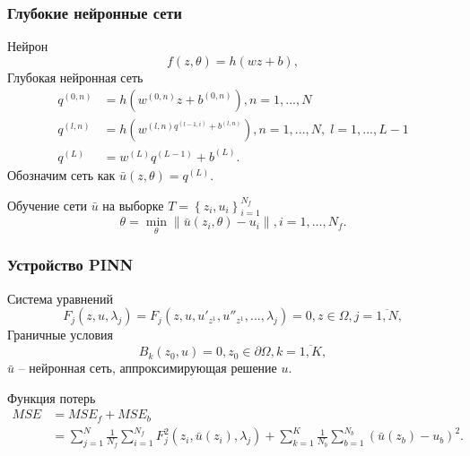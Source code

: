 \documentclass[t]{beamer}
\newcommand{\brr}[1]{{\left( #1 \right)}}
\newcommand{\brc}[1]{{\left\{ #1 \right\}}}
\newcommand{\brn}[1]{{\left\lVert #1 \right\rVert}}
\begin{document}
    \begin{frame}
        \frametitle{Глубокие нейронные сети}
        Нейрон
        \begin{equation*}
            f(z, \theta) = h(wz+b),
        \end{equation*}
        Глубокая нейронная сеть
        \begin{equation*}
            \begin{aligned}
                q^{(0, n)} & = h(w^{(0,n)}z + b^{(0,n)}), n=1,...,N\\
                q^{(l, n)} & = h(w^{(l,n) q^{(l-1,i)} + b^{(l,n)}}), n=1,...,N,\; l=1,...,L-1 \\
                q^{(L)}    & = w^{(L)}q^{(L-1)}+b^{(L)}.
            \end{aligned}
        \end{equation*}
        Обозначим сеть как $\bar{u}(z, \theta) = q^{(L)}$.
        
        Обучение сети $\bar{u}$ на выборке $T = \brc{z_i, u_i}_{i=1}^{N_f}$
        \begin{equation*}
            \theta=\min_\theta\brn{\bar{u}(z_i,\theta)-u_i}, i=1, ..., N_f.
        \end{equation*}
    \end{frame}
    \begin{frame}
        \frametitle{Устройство PINN}
        Система уравнений
        \begin{equation*}\label{eq:1syst}
            F_j(z, u, \lambda_j) = F_j(z, u, u'_{z^1}, u''_{z^1}, ..., \lambda_j) = 0, z\in\Omega, j=\overline{1,N},
        \end{equation*}
        Граничные условия
        \begin{equation*}\label{eq:1bnd}
            B_k(z_0, u) = 0, z_0 \in \partial\Omega, k=\overline{1,K},
        \end{equation*}
        $\bar{u}$ -- нейронная сеть, аппроксимирующая решение $u$.

        Функция потерь
        \begin{equation*} \label{eq:pinn_loss}
            \begin{aligned}
                MSE & = MSE_f + MSE_b \\
                    & = \sum_{j=1}^N\frac{1}{N_f}\sum_{i=1}^{N_f} F_j^2(z_i, \bar{u}(z_i), \lambda_j) + \sum_{k=1}^{K}\frac{1}{N_b}\sum_{b=1}^{N_b} (\bar{u}(z_b) - u_b)^2.
            \end{aligned}
        \end{equation*}
    \end{frame}
\end{document}

